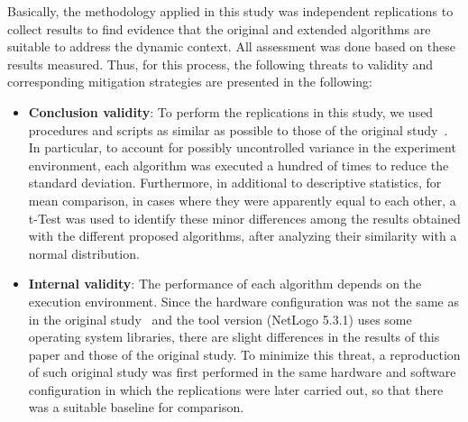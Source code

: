 
Basically, the methodology applied in this study was independent replications to collect results to find evidence that the original and extended algorithms are suitable to address the dynamic context. All assessment was done based on these results measured. Thus, for this process, the following threats to validity and corresponding mitigation strategies are presented in the following: 

\begin{itemize}
   \item \textbf{Conclusion validity}: To perform the replications in this study, we used procedures and scripts as similar as possible to those of the original study~\cite{MAS07}. In particular, to account for possibly uncontrolled variance in the experiment environment, each algorithm was executed a hundred of times to reduce the standard deviation. Furthermore, in additional to descriptive statistics, for mean comparison, in cases where they were apparently equal to each other, a t-Test was used to identify these minor differences among the results obtained with the different proposed algorithms, after analyzing their similarity with a normal distribution.
   
   
   \item \textbf{Internal validity}: The performance of each algorithm depends on the execution environment. Since the hardware configuration was not the same as in the original study~\cite{MAS07} and the tool version (NetLogo 5.3.1) uses some operating system libraries, there are slight differences in the results of this paper and those of the original study. To minimize this threat, a reproduction of such original study was first performed in the same hardware and software configuration in which the replications were later carried out, so that there was a suitable baseline for comparison.
   

\end{itemize}
